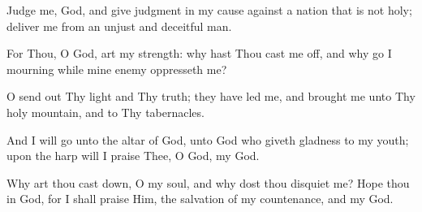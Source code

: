 Judge me, God, and give judgment in my cause against a nation that is not holy; deliver me from an unjust and deceitful man.

For Thou, O God, art my strength: why hast Thou cast me off, and why go I mourning while mine enemy oppresseth me?

O send out Thy light and Thy truth; they have led me, and brought me unto Thy holy mountain, and to Thy tabernacles.

And I will go unto the altar of God, unto God who giveth gladness to my youth; upon the harp will I praise Thee, O God, my God.

Why art thou cast down, O my soul, and why dost thou disquiet me? Hope thou in God, for I shall praise Him, the salvation of my countenance, and my God.
